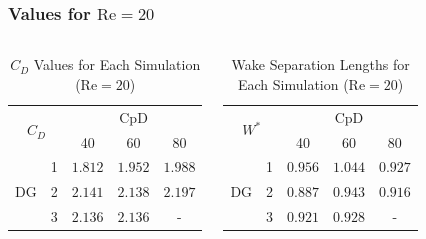 \begin{frame}[allowframebreaks]
	\frametitle{Values for $\text{Re}=20$}
	\begin{columns}
		\column{6cm}
		\begin{table}[htp]
			\centering
			\def\arraystretch{1.5}
			\begin{tabular}{|c|c|c|c|c|}
				\hline
				\multicolumn{2}{|c|}{\multirow{2}{*}{$C_D$}} & \multicolumn{3}{c|}{CpD} \\ \cline{3-5} 
				\multicolumn{2}{|c|}{}                       & 40     & 60    & 80    \\ \hline
				\multirow{3}{*}{DG}            & 1           &    $1.812$    &  $1.952$     &    $1.988$    \\ \cline{2-5} 
				& 2           &    $2.141$    &    $2.138$   &   $2.197$     \\ \cline{2-5} 
				& 3           &    $2.136$    &     $2.136$  &   -     \\ \hline
			\end{tabular}
			\caption[$C_D$ Values for Each Simulation]{$C_D$ Values for Each Simulation ($\text{Re} = 20$)}	
			\label{C_D20}
		\end{table}
		\column{6cm}
			\begin{table}[htp]
				\centering
				\def\arraystretch{1.5}
				\begin{tabular}{|c|c|c|c|c|}
					\hline
					\multicolumn{2}{|c|}{\multirow{2}{*}{$W^*$}} & \multicolumn{3}{c|}{CpD} \\ \cline{3-5} 
					\multicolumn{2}{|c|}{}                       & 40     & 60    & 80    \\ \hline
					\multirow{3}{*}{DG}            & 1           &    $0.956$    &     $1.044$  &    $0.927$    \\ \cline{2-5} 
					& 2           &    $0.887$    &     $0.943$  &    $0.916$    \\ \cline{2-5} 
					& 3           &     $0.921$   &     $0.928$  &    -    \\ \hline
				\end{tabular}
				\caption{Wake Separation Lengths for Each Simulation ($\text{Re} = 20$)}	
				\label{W20}
			\end{table}		

\end{columns}
\end{frame}
